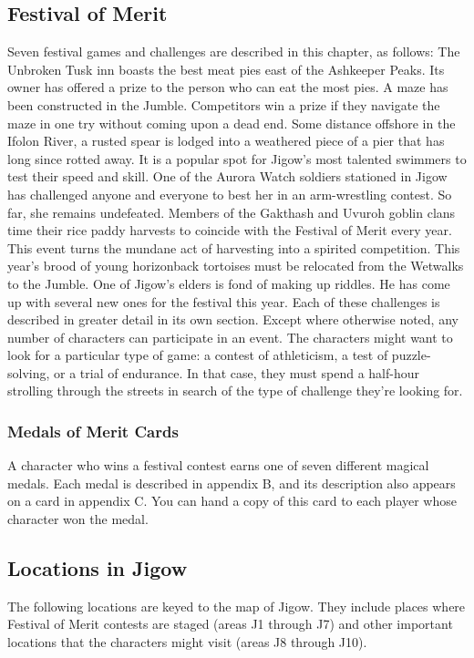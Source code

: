 \documentclass[10pt,a4,twoside,twocolumn,openany,nodeprecatedcode]{dndbook}
\begin{document}
\subsection{Festival of Merit}
Seven festival games and challenges are described in this chapter, as follows:
{{The Unbroken Tusk inn boasts the best meat pies east of the Ashkeeper Peaks. Its owner has offered a prize to the person who can eat the most pies.}}
{{A maze has been constructed in the Jumble. Competitors win a prize if they navigate the maze in one try without coming upon a dead end.}}
{{Some distance offshore in the Ifolon River, a rusted spear is lodged into a weathered piece of a pier that has long since rotted away. It is a popular spot for Jigow's most talented swimmers to test their speed and skill.}}
{{One of the Aurora Watch soldiers stationed in Jigow has challenged anyone and everyone to best her in an arm-wrestling contest. So far, she remains undefeated.}}
{{Members of the Gakthash and Uvuroh goblin clans time their rice paddy harvests to coincide with the Festival of Merit every year. This event turns the mundane act of harvesting into a spirited competition.}}
{{This year's brood of young horizonback tortoises must be relocated from the Wetwalks to the Jumble.}}
{{One of Jigow's elders is fond of making up riddles. He has come up with several new ones for the festival this year.}}
Each of these challenges is described in greater detail in its own section. Except where otherwise noted, any number of characters can participate in an event.
The characters might want to look for a particular type of game: a contest of athleticism, a test of puzzle-solving, or a trial of endurance. In that case, they must spend a half-hour strolling through the streets in search of the type of challenge they're looking for.
\subsubsection{Medals of Merit Cards}
A character who wins a festival contest earns one of seven different magical medals. Each medal is described in appendix B, and its description also appears on a card in appendix C. You can hand a copy of this card to each player whose character won the medal.
\subsection{Locations in Jigow}
The following locations are keyed to the map of Jigow. They include places where Festival of Merit contests are staged (areas J1 through J7) and other important locations that the characters might visit (areas J8 through J10).
\end{document}

